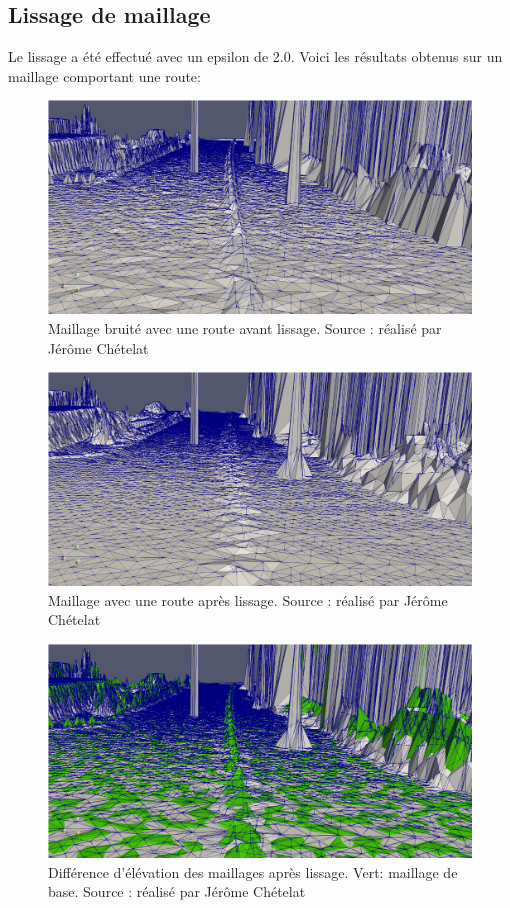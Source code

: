 \subsection{Lissage de maillage}

Le lissage a été effectué avec un epsilon de 2.0.
Voici les résultats obtenus sur un maillage comportant une route: 

\begin{figure}[htbp!]
    \centering
    \includegraphics[width=0.8\linewidth]{figures/mesh_noise.png}
    \caption{Maillage bruité avec une route avant lissage. Source : réalisé par Jérôme Chételat}
    \label{fig:mesh_noise}
\end{figure}

\begin{figure}[htbp!]
    \centering
    \includegraphics[width=0.8\linewidth]{figures/mesh_noise_not_noise.png}
    \caption{Maillage avec une route après lissage. Source : réalisé par Jérôme Chételat}
    \label{fig:mesh_noise_not_noise}
\end{figure}

\begin{figure}[htbp!]
    \centering
    \includegraphics[width=0.8\linewidth]{figures/mesh_noise_difference.png}
    \caption{Différence d'élévation des maillages après lissage. Vert: maillage de base. Source : réalisé par Jérôme Chételat}
    \label{fig:mesh_noise_diff}
\end{figure}

